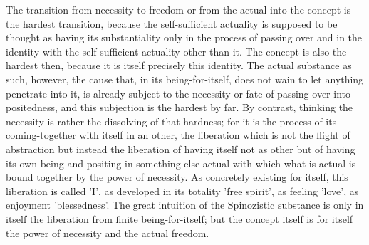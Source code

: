 The transition from necessity to freedom or
from the actual into the concept is the hardest transition,
because the self-sufficient actuality is supposed to be thought
as having its substantiality only in the process of passing over
and in the identity with the self-sufficient actuality other than it.
The concept is also the hardest then,
because it is itself precisely this identity.
The actual substance as such, however,
the cause that, in its being-for-itself,
does not wain to let anything penetrate into it,
is already subject to the necessity or fate
of passing over into positedness,
and this subjection is the hardest by far.
By contrast, thinking the necessity is
rather the dissolving of that hardness;
for it is the process of its coming-together
with itself in an other,
the liberation which is not the flight of abstraction
but instead the liberation of having itself
not as other but of having its own being and positing
in something else actual with which what is actual is
bound together by the power of necessity.
As concretely existing for itself,
this liberation is called 'I',
as developed in its totality 'free spirit',
as feeling 'love', as enjoyment 'blessedness'.
The great intuition of the Spinozistic substance is
only in itself the liberation from finite being-for-itself;
but the concept itself is for itself
the power of necessity and the actual freedom.
